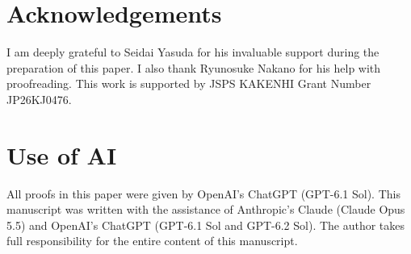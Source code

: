 \section*{Acknowledgements}
I am deeply grateful to Seidai Yasuda for his invaluable support during the preparation of this paper.
I also thank Ryunosuke Nakano for his help with proofreading.
This work is supported by JSPS KAKENHI Grant Number JP26KJ0476.

\section*{Use of AI}
All proofs in this paper were given by OpenAI's ChatGPT (GPT-6.1 Sol).
This manuscript was written with the assistance of Anthropic's Claude (Claude Opus 5.5) and OpenAI's ChatGPT (GPT-6.1 Sol and GPT-6.2 Sol).
The author takes full responsibility for the entire content of this manuscript.
